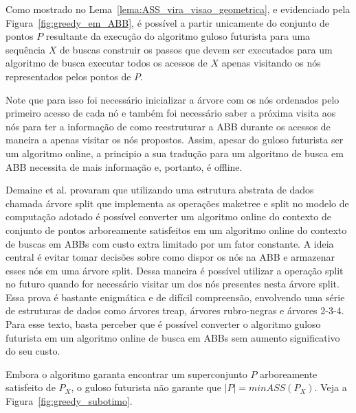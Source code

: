 Como mostrado no Lema~\ref{lema:ASS_vira_visao_geometrica}, e evidenciado pela Figura~\ref{fig:greedy_em_ABB}, é possível a partir unicamente do conjunto de pontos $P$ resultante da execução do algoritmo guloso futurista para uma sequência $X$ de buscas construir os passos que devem ser executados para um algoritmo de busca executar todos os acessos de $X$ apenas visitando os nós representados pelos pontos de $P$. 

Note que para isso foi necessário inicializar a árvore com os nós ordenados pelo primeiro acesso de cada nó e também foi necessário saber a próxima visita aos nós para ter a informação de como reestruturar a ABB durante os acessos de maneira a apenas visitar os nós propostos. Assim, apesar do guloso futurista ser um algoritmo online, a principio a sua tradução para um algoritmo de busca em ABB necessita de mais informação e, portanto, é offline.

Demaine et al. \cite{geometry_of_bst} provaram que utilizando uma estrutura abstrata de dados chamada árvore split que implementa as operações maketree e split no modelo de computação adotado é possível converter um algoritmo online do contexto de conjunto de pontos arboreamente satisfeitos em um algoritmo online do contexto de buscas em ABBs com custo extra limitado por um fator constante. A ideia central é evitar tomar decisões sobre como dispor os nós na ABB e armazenar esses nós em uma árvore split. Dessa maneira é possível utilizar a operação split no futuro quando for necessário visitar um dos nós presentes nesta árvore split. Essa prova é bastante enigmática e de difícil compreensão, envolvendo uma série de estruturas de dados como árvores treap, árvores rubro-negras e árvores 2-3-4. Para esse texto, basta perceber que é possível converter o algoritmo guloso futurista em um algoritmo online de busca em ABBs sem aumento significativo do seu custo.

Embora o algoritmo garanta encontrar um superconjunto $P$ arboreamente satisfeito de $P_X$, o guloso futurista não garante que $|P| = minASS(P_X)$. Veja a Figura~\ref{fig:greedy_subotimo}.

